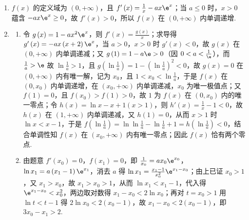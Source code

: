 \begin{solution}
\begin{enumerate}
\item \(f\left(x\right)\) 的定义域为 \(\left(0,+\infty\right)\)，且 \(f'\left(x\right)=\frac{1}{x}-ax\e^{x}\)；当 \(a\le 0\) 时，\(x>0\) 蕴含 \(-ax\e^{x}\ge 0\)，故 \(f'\left(x\right)>0\)，所以 \(f\left(x\right)\) 在 \(\left(0,+\infty\right)\) 内单调递增.
\item
\begin{enumerate}
\item 令 \(g\left(x\right)=1-ax^{2}\e^{x}\)，则 \(f'\left(x\right)=\frac{g\left(x\right)}{x}\)；求导得 \(g'\left(x\right)=-ax\left(x+2\right)\e^{x}\)，当 \(a>0\)，\(x>0\) 时 \(g'\left(x\right)<0\)，故 \(g\left(x\right)\) 在 \(\left(0,+\infty\right)\) 内单调递减；又 \(g\left(1\right)=1-a\e>0\)（因 \(0<a<\frac{1}{\e}\)），而 \(\frac{1}{a}>\e\) 故 \(\ln\frac{1}{a}>1\)，且 \(g\left(\ln\frac{1}{a}\right)=1-\left(\ln\frac{1}{a}\right)^{2}<0\)，故 \(g\left(x\right)=0\) 在 \(\left(0,+\infty\right)\) 内有唯一解，记为 \(x_{0}\)，且 \(1<x_{0}<\ln\frac{1}{a}\)，于是 \(f\left(x\right)\) 在 \(\left(0,x_{0}\right)\) 内单调递增，在 \(\left(x_{0},+\infty\right)\) 内单调递减，\(x_{0}\) 为唯一极值点；又 \(f\left(1\right)=0\)，且 \(f\left(x_{0}\right)>f\left(1\right)>0\)，故 \(1\) 为 \(f\left(x\right)\) 在 \(\left(0,x_{0}\right)\) 内的唯一零点；令 \(h\left(x\right)=\ln x-x+1\left(x>1\right)\)，则 \(h'\left(x\right)=\frac{1}{x}-1<0\)，故 \(h\left(x\right)\) 在 \(\left(1,+\infty\right)\) 内单调递减，又 \(h\left(1\right)=0\)，从而 \(x>1\) 时 \(\ln x<x-1\)，于是 \(f\left(\ln\frac{1}{a}\right)=\ln\ln\frac{1}{a}-\ln\frac{1}{a}+1=h\left(\ln\frac{1}{a}\right)<0\)，结合单调性知 \(f\left(x\right)\) 在 \(\left(x_{0},+\infty\right)\) 内有唯一零点；因此 \(f\left(x\right)\) 恰有两个零点.
\item 由题意 \(f'\left(x_{0}\right)=0\)，\(f\left(x_{1}\right)=0\)，即 \(\frac{1}{x_{0}}=ax_{0}\e^{x_{0}}\)，\(\ln x_{1}=a\left(x_{1}-1\right)\e^{x_{1}}\)，消去 \(a\) 得 \(\ln x_{1}=\frac{x_{1}-1}{x_{0}^{2}}\e^{x_{1}-x_{0}}\)；由上已证 \(x_{0}>1\)，又 \(x_{1}>x_{0}\)，故 \(x_{1}>x_{0}>1\)，从而 \(\ln x_{1}<x_{1}-1\)，代入得 \(\e^{x_{1}-x_{0}}<x_{0}^{2}\)，两边取对数得 \(x_{1}-x_{0}<2\ln x_{0}\)；再对 \(t=x_{0}>1\) 用 \(\ln t<t-1\) 得 \(2\ln x_{0}<2\left(x_{0}-1\right)\)，故 \(x_{1}-x_{0}<2\left(x_{0}-1\right)\)，即 \(3x_{0}-x_{1}>2\).
\end{enumerate}
\end{enumerate}
\end{solution}
